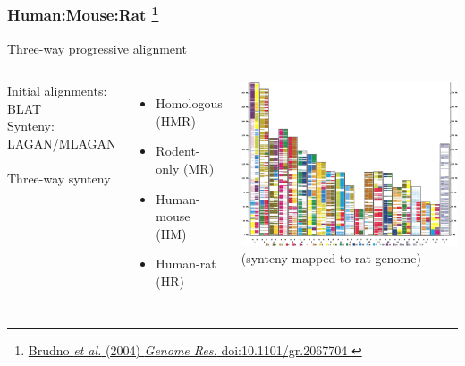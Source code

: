 %
\begin{frame}
  \frametitle{Human:Mouse:Rat
  \footnote{\tiny{\href{http://dx.doi.org/10.1101/gr.2067704
}{Brudno \textit{et al.} (2004) \textit{Genome Res.} doi:10.1101/gr.2067704
}}}
  }
  \textcolor{hutton_green}{Three-way progressive alignment} 
  \begin{columns}[T] 
    \textcolor{hutton_blue}{Initial alignments: BLAT \\
    Synteny: LAGAN/MLAGAN \\~\\}
    \textcolor{hutton_purple}{Three-way synteny}
      \begin{itemize}
        \item Homologous (HMR)
        \item Rodent-only (MR)
        \item Human-mouse (HM)
        \item Human-rat (HR)
      \end{itemize}
      \begin{center}
        \includegraphics[width=\textwidth]{images/hmr_alignment} \\
        {\tiny(synteny mapped to rat genome)}
      \end{center}
  \end{columns}    
\end{frame}

